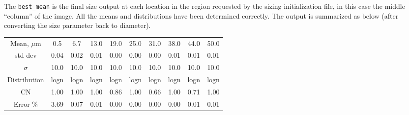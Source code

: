 The \texttt{best\_mean} is the final size output at each location in the region requested by the sizing initialization file, in this case the middle ``column'' of the image.  All the means and distributions have been determined correctly.  The output is summarized as below (after converting the size parameter back to diameter).


\begin{tabular}{cccccccccc}
\\ \hline
Mean, $\mu$m  & 0.5 & 6.7 & 13.0 & 19.0 & 25.0 & 31.0 & 38.0 & 44.0 & 50.0 \\ 
std dev  & 0.04 & 0.02 & 0.01 & 0.00 & 0.00 & 0.00 & 0.01 & 0.01 & 0.01 \\ 
 $\sigma$  & 10.0 & 10.0 & 10.0 & 10.0 & 10.0 & 10.0 & 10.0 & 10.0 & 10.0 \\ 
Distribution & logn & logn & logn & logn & logn & logn & logn & logn & logn \\ 
 CN  & 1.00 & 1.00 & 1.00 & 0.86 & 1.00 & 0.66 & 1.00 & 0.71 & 1.00 \\ 
Error \%  & 3.69 & 0.07 & 0.01 & 0.00 & 0.00 & 0.00 & 0.00 & 0.01 & 0.01 \\ \hline 
\end{tabular}
